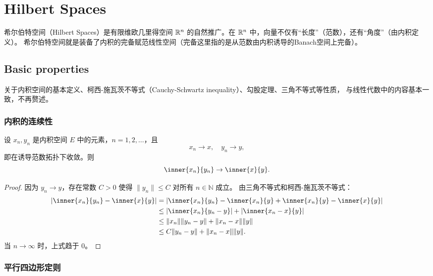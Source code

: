 \chapter{Hilbert Spaces}

希尔伯特空间（Hilbert Spaces）是有限维欧几里得空间 \(\mathbb{R}^n\) 的自然推广。在
\(\mathbb{R}^n\) 中，向量不仅有“长度”（范数），还有“角度”（由内积定义）。
希尔伯特空间就是装备了内积的完备赋范线性空间（完备这里指的是从范数由内积诱导的Banach空间上完备）。

\section{Basic properties}

关于内积空间的基本定义、柯西-施瓦茨不等式（Cauchy-Schwartz inequality）、勾股定理、三角不等式等性质，
与线性代数中的内容基本一致，不再赘述。

\subsection{内积的连续性}

\begin{theorem}
    设 \(x_n, y_n\) 是内积空间 \(E\) 中的元素，\(n=1, 2, \dots\)，且
    \[
        x_n \to x, \quad y_n \to y,
    \]
    即在诱导范数拓扑下收敛。则
    \[
        \inner{x_n}{y_n} \to \inner{x}{y}.
    \]
\end{theorem}

\begin{proof}
    因为 \(y_n \to y\)，存在常数 \(C > 0\) 使得 \(\|y_n\| \le C\) 对所有 \(n \in
    \mathbb{N}\) 成立。
    由三角不等式和柯西-施瓦茨不等式：
    \begin{align*}
        |\inner{x_n}{y_n} - \inner{x}{y}|
        &= |\inner{x_n}{y_n} - \inner{x_n}{y} +
        \inner{x_n}{y} - \inner{x}{y}| \\
        &\le |\inner{x_n}{y_n - y}| + |\inner{x_n - x}{y}| \\
        &\le \|x_n\| \|y_n - y\| + \|x_n - x\| \|y\| \\
        &\le C \|y_n - y\| + \|x_n - x\| \|y\|.
    \end{align*}
    当 \(n \to \infty\) 时，上式趋于 \(0\)。
\end{proof}

\subsection{平行四边形定则}

